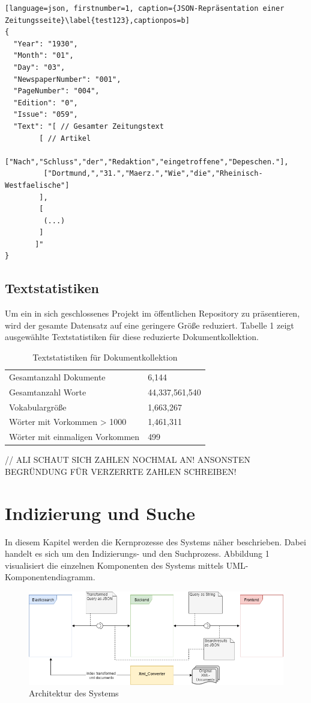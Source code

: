 \documentclass[11pt,a4paper, halfparskip]{scrartcl}
\begin{document}
\break

\begin{lstlisting}[language=json, firstnumber=1, caption={JSON-Repräsentation einer Zeitungsseite}\label{test123},captionpos=b]
{
  "Year": "1930",
  "Month": "01",
  "Day": "03",
  "NewspaperNumber": "001",
  "PageNumber": "004",
  "Edition": "0",
  "Issue": "059",
  "Text": "[ // Gesamter Zeitungstext
	    [ // Artikel
	     ["Nach","Schluss","der","Redaktion","eingetroffene","Depeschen."], 
	     ["Dortmund,","31.","Maerz.","Wie","die","Rheinisch-Westfaelische"] 
	    ],
	    [
	     (...)
	    ] 
	   ]"
}
\end{lstlisting}

\subsection{Textstatistiken}
Um ein in sich geschlossenes Projekt im öffentlichen Repository zu präsentieren, wird der gesamte Datensatz auf eine geringere Größe reduziert.
Tabelle 1 zeigt ausgewählte Textstatistiken für diese reduzierte Dokumentkollektion.

\begin{table}[h!]
	\centering
	\begin{tabularx}{0.8\textwidth}{lX}
		\hline
		Gesamtanzahl Dokumente & 6,144\\
		Gesamtanzahl Worte & 44,337,561,540 \\
		Vokabulargröße & 1,663,267 \\
		Wörter mit Vorkommen > 1000 & 1,461,311 \\
		Wörter mit einmaligen Vorkommen & 499 \\
		\hline
	\end{tabularx}
	\caption{Textstatistiken für Dokumentkollektion}
\end{table}

// ALI SCHAUT SICH ZAHLEN NOCHMAL AN! ANSONSTEN BEGRÜNDUNG FÜR VERZERRTE ZAHLEN SCHREIBEN!

\section{Indizierung und Suche}

In diesem Kapitel werden die Kernprozesse des Systems näher beschrieben. 
Dabei handelt es sich um den Indizierungs- und den Suchprozess.
Abbildung 1 visualisiert die einzelnen Komponenten des Systems mittels UML-Komponentendiagramm. 

\begin{figure}[h]
	\includegraphics[width=\linewidth]{images/Architektur.png}
	\caption{Architektur des Systems}
\end{figure}
\end{document}
